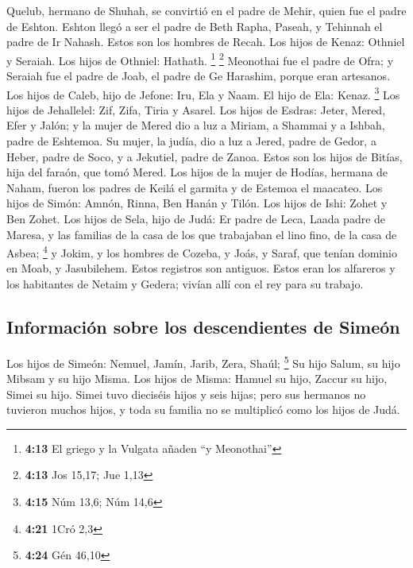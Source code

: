  Quelub, hermano de Shuhah, se convirtió en el padre de
Mehir, quien fue el padre de Eshton.  Eshton llegó a ser
el padre de Beth Rapha, Paseah, y Tehinnah el padre de Ir Nahash. Estos
son los hombres de Recah.  Los hijos de Kenaz: Othniel y
Seraiah. Los hijos de Othniel: Hathath. \footnote{\textbf{4:13} El
  griego y la Vulgata añaden ``y Meonothai''} \footnote{\textbf{4:13}
  Jos 15,17; Jue 1,13}  Meonothai fue el padre de Ofra; y
Seraiah fue el padre de Joab, el padre de Ge Harashim, porque eran
artesanos.  Los hijos de Caleb, hijo de Jefone: Iru, Ela
y Naam. El hijo de Ela: Kenaz. \footnote{\textbf{4:15} Núm 13,6; Núm
  14,6}  Los hijos de Jehallelel: Zif, Zifa, Tiria y
Asarel.  Los hijos de Esdras: Jeter, Mered, Efer y Jalón;
y la mujer de Mered dio a luz a Miriam, a Shammai y a Ishbah, padre de
Eshtemoa.  Su mujer, la judía, dio a luz a Jered, padre
de Gedor, a Heber, padre de Soco, y a Jekutiel, padre de Zanoa. Estos
son los hijos de Bitías, hija del faraón, que tomó Mered.
 Los hijos de la mujer de Hodías, hermana de Naham,
fueron los padres de Keilá el garmita y de Estemoa el maacateo.
 Los hijos de Simón: Amnón, Rinna, Ben Hanán y Tilón. Los
hijos de Ishi: Zohet y Ben Zohet.  Los hijos de Sela,
hijo de Judá: Er padre de Leca, Laada padre de Maresa, y las familias de
la casa de los que trabajaban el lino fino, de la casa de Asbea;
\footnote{\textbf{4:21} 1Cró 2,3}  y Jokim, y los hombres
de Cozeba, y Joás, y Saraf, que tenían dominio en Moab, y Jasubilehem.
Estos registros son antiguos.  Estos eran los alfareros y
los habitantes de Netaim y Gedera; vivían allí con el rey para su
trabajo.

\hypertarget{informaciuxf3n-sobre-los-descendientes-de-simeuxf3n}{%
\subsection{Información sobre los descendientes de
Simeón}\label{informaciuxf3n-sobre-los-descendientes-de-simeuxf3n}}

 Los hijos de Simeón: Nemuel, Jamín, Jarib, Zera, Shaúl;
\footnote{\textbf{4:24} Gén 46,10}  Su hijo Salum, su
hijo Mibsam y su hijo Misma.  Los hijos de Misma: Hamuel
su hijo, Zaccur su hijo, Simei su hijo.  Simei tuvo
dieciséis hijos y seis hijas; pero sus hermanos no tuvieron muchos
hijos, y toda su familia no se multiplicó como los hijos de Judá.

